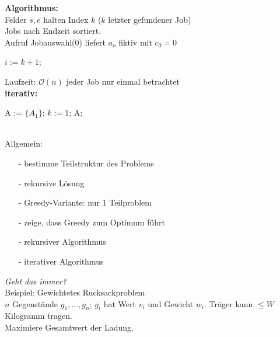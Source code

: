 \textbf{Algorithmus:}\\
Felder $s, e$ halten Index $k$ ($k$ letzter gefundener Job)\\
Jobs nach Endzeit sortiert.\\
Aufruf Jobauswahl(0) liefert $a_o$ fiktiv mit $c_0 = 0$\\
\begin{algorithmic}
$i := k+1$;\\
 
\EndWhile
{} 
\Else {}
\EndIf
\EndFunction
\end{algorithmic}
Laufzeit: $\mathcal O(n)$ jeder Job nur einmal betrachtet\\
\textbf{iterativ:}

\begin{algorithmic}
\State A := $\lbrace A_1 \rbrace$; 
\State $ k := 1$;
  \State{
	\If{$s[1 \geq e[k]$} \State{
		A := A $\cup \lbrace a_i \rbrace$;
		$k$ := 1;}
	\EndIf}
\EndFor
\Return A;
\end{algorithmic}\ \\

Allgemein:\\
\begin{itemize}
	\item[-] bestimme Teilstruktur des Problems
	\item[-] rekursive Lösung
	\item[-] Greedy-Variante: nur 1 Teilproblem
	\item[-] zeige, dass Greedy zum Optimum führt
	\item[-] rekursiver Algorithmus
	\item[-] iterativer Algorithmus
\end{itemize}

\emph{Geht das immer?}\\
Beispiel: Gewichtetes Rucksackproblem\\
$n$ Gegenstände $g_1, ..., g_n$; $g_i$ hat Wert $v_i$ und Gewicht $w_i$. Träger kann $\leq W$ Kilogramm tragen.\\
Maximiere Gesamtwert der Ladung.\\

